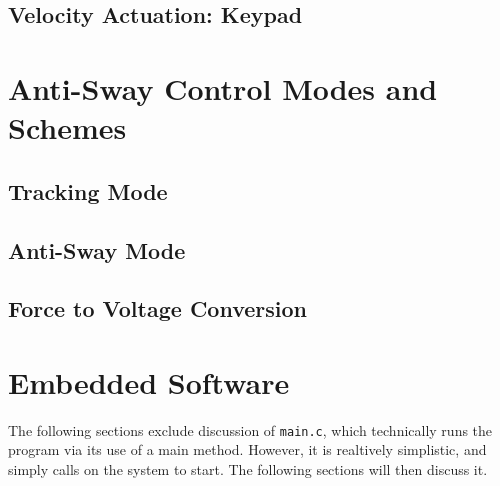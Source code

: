 \documentclass[letterpaper]{article}
\begin{document}
\subsection{Velocity Actuation: Keypad}

\newpage

\section{Anti-Sway Control Modes and Schemes}
\subsection{Tracking Mode}
\subsection{Anti-Sway Mode}
\subsection{Force to Voltage Conversion}

\newpage

\section{Embedded Software} \label{section-emb-soft}
The following sections exclude discussion of \texttt{main.c}, which technically runs the program via its use of a main method. However, it is realtively simplistic, and simply calls on the system to start. The following sections will then discuss it.
\end{document}

